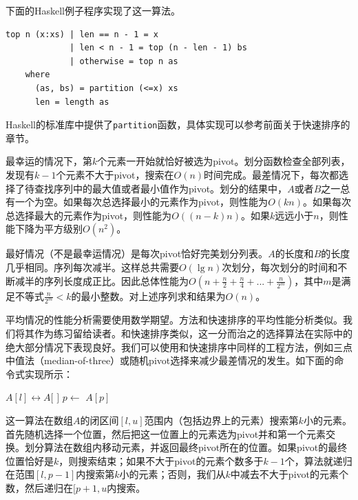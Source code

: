 \documentclass[UTF8]{article}
\begin{document}
下面的Haskell例子程序实现了这一算法。

\lstset{language=Haskell}
\begin{lstlisting}
top n (x:xs) | len == n - 1 = x
             | len < n - 1 = top (n - len - 1) bs
             | otherwise = top n as
    where
      (as, bs) = partition (<=x) xs
      len = length as
\end{lstlisting}

Haskell的标准库中提供了\texttt{partition}函数，具体实现可以参考前面关于快速排序的章节。

最幸运的情况下，第$k$个元素一开始就恰好被选为pivot。划分函数检查全部列表，发现有$k-1$个元素不大于pivot，搜索在$O(n)$时间完成。最差情况下，每次都选择了待查找序列中的最大值或者最小值作为pivot。划分的结果中，$A$或者$B$之一总有一个为空。如果每次总选择最小的元素作为pivot，则性能为$O(kn)$。如果每次总选择最大的元素作为pivot，则性能为$O((n-k)n)$。如果$k$远远小于$n$，则性能下降为平方级别$O(n^2)$。

最好情况（不是最幸运情况）是每次pivot恰好完美划分列表。$A$的长度和$B$的长度几乎相同。序列每次减半。这样总共需要$O(\lg n)$次划分，每次划分的时间和不断减半的序列长度成正比。因此总体性能为$O(n + \frac{n}{2} + \frac{n}{4} + ... + \frac{n}{2^m})$，其中$m$是满足不等式$\frac{n}{2^m} < k$的最小整数。对上述序列求和结果为$O(n)$。

平均情况的性能分析需要使用数学期望。方法和快速排序的平均性能分析类似。我们将其作为练习留给读者。和快速排序类似，这一分而治之的选择算法在实际中的绝大部分情况下表现良好。我们可以使用和快速排序中同样的工程方法，例如三点中值法（median-of-three）或随机pivot选择来减少最差情况的发生。如下面的命令式实现所示：

\begin{algorithmic}[1]
  \State {} $A[l] \leftrightarrow A[$  $]$ 
  \State $p \gets$ 
    \State \Return $A[p]$
  \EndIf
    \State \Return {}
  \EndIf
  \State \Return {}
\EndFunction
\end{algorithmic}

这一算法在数组$A$的闭区间$[l, u]$范围内（包括边界上的元素）搜索第$k$小的元素。首先随机选择一个位置，然后把这一位置上的元素选为pivot并和第一个元素交换。划分算法在数组内移动元素，并返回最终pivot所在的位置。如果pivot的最终位置恰好是$k$，则搜索结束；如果不大于pivot的元素个数多于$k-1$个，算法就递归在范围$[l, p-1]$内搜索第$k$小的元素；否则，我们从$k$中减去不大于pivot的元素个数，然后递归在$[p+1, u$内搜索。
\end{document}
